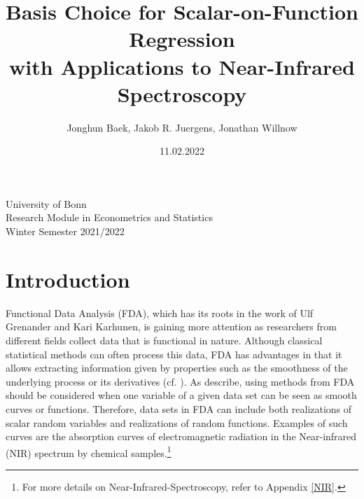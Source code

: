 \documentclass[11pt,twoside,a4paper]{article}
\begin{document}
\begin{titlepage}

	\title{{\LARGE Basis Choice for Scalar-on-Function Regression \\ with Applications to Near-Infrared Spectroscopy}}
	\author{Jonghun Baek, Jakob R. Juergens, Jonathan Willnow}
	\date{11.02.2022}
	\maketitle
	\thispagestyle{empty}
	\vspace{1.5 cm}
	\begin{center}
		University of Bonn \\
		Research Module in Econometrics and Statistics \\
		Winter Semester 2021/2022
	\end{center}
\end{titlepage}
	\newpage
	
	\tableofcontents
	
	\newpage
	
	\setlength{\abovedisplayskip}{0.35cm}
	\setlength{\belowdisplayskip}{0.35cm}

	\setlength{\abovedisplayshortskip}{0.2cm}
	\setlength{\belowdisplayshortskip}{0.35cm}

	\section{Introduction}
		
	Functional Data Analysis (FDA), which has its roots in the work of Ulf Grenander and Kari Karhunen, is gaining more attention as researchers from different fields collect data that is functional in nature. Although classical statistical methods can often process this data, FDA has advantages in that it allows extracting information given by properties such as the smoothness of the underlying process or its derivatives (cf. \cite{levitin_introduction_2007}).	As \cite{kokoszka_introduction_2017} describe, using methods from FDA should be considered when one variable of a given data set can be seen as smooth curves or functions.	 
	Therefore, data sets in FDA can include both realizations of scalar random variables and realizations of random functions. Examples of such curves are the absorption curves of electromagnetic radiation in the Near-infrared (NIR) spectrum by chemical samples.\footnote{For more details on Near-Infrared-Spectroscopy, refer to Appendix \ref{NIR}.}
	
\end{document}
